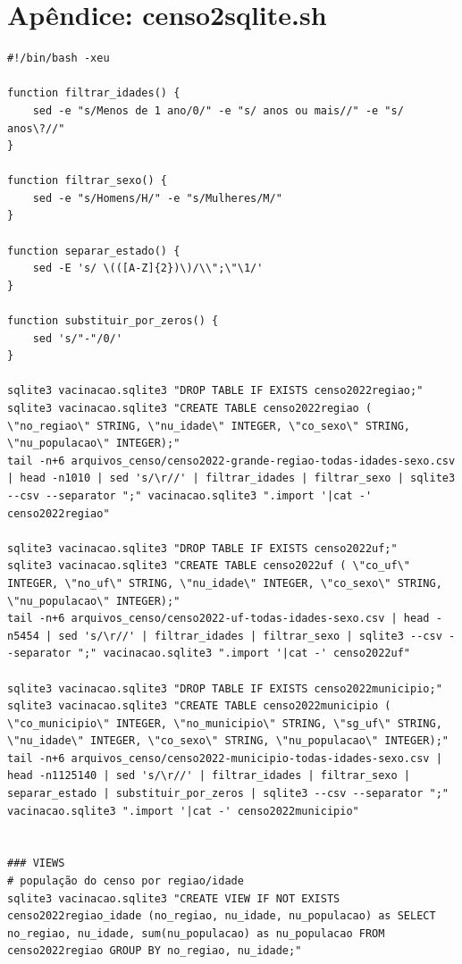 \documentclass[12pt]{article}
\begin{document}
\section{Apêndice: censo2sqlite.sh}
\begin{verbatim}
#!/bin/bash -xeu

function filtrar_idades() {
    sed -e "s/Menos de 1 ano/0/" -e "s/ anos ou mais//" -e "s/ anos\?//"
}

function filtrar_sexo() {
    sed -e "s/Homens/H/" -e "s/Mulheres/M/"
}

function separar_estado() {
    sed -E 's/ \(([A-Z]{2})\)/\\";\"\1/'
}

function substituir_por_zeros() {
    sed 's/"-"/0/'
}

sqlite3 vacinacao.sqlite3 "DROP TABLE IF EXISTS censo2022regiao;"
sqlite3 vacinacao.sqlite3 "CREATE TABLE censo2022regiao ( \"no_regiao\" STRING, \"nu_idade\" INTEGER, \"co_sexo\" STRING, \"nu_populacao\" INTEGER);"
tail -n+6 arquivos_censo/censo2022-grande-regiao-todas-idades-sexo.csv | head -n1010 | sed 's/\r//' | filtrar_idades | filtrar_sexo | sqlite3 --csv --separator ";" vacinacao.sqlite3 ".import '|cat -' censo2022regiao"

sqlite3 vacinacao.sqlite3 "DROP TABLE IF EXISTS censo2022uf;"
sqlite3 vacinacao.sqlite3 "CREATE TABLE censo2022uf ( \"co_uf\" INTEGER, \"no_uf\" STRING, \"nu_idade\" INTEGER, \"co_sexo\" STRING, \"nu_populacao\" INTEGER);"
tail -n+6 arquivos_censo/censo2022-uf-todas-idades-sexo.csv | head -n5454 | sed 's/\r//' | filtrar_idades | filtrar_sexo | sqlite3 --csv --separator ";" vacinacao.sqlite3 ".import '|cat -' censo2022uf"

sqlite3 vacinacao.sqlite3 "DROP TABLE IF EXISTS censo2022municipio;"
sqlite3 vacinacao.sqlite3 "CREATE TABLE censo2022municipio ( \"co_municipio\" INTEGER, \"no_municipio\" STRING, \"sg_uf\" STRING, \"nu_idade\" INTEGER, \"co_sexo\" STRING, \"nu_populacao\" INTEGER);"
tail -n+6 arquivos_censo/censo2022-municipio-todas-idades-sexo.csv | head -n1125140 | sed 's/\r//' | filtrar_idades | filtrar_sexo | separar_estado | substituir_por_zeros | sqlite3 --csv --separator ";" vacinacao.sqlite3 ".import '|cat -' censo2022municipio"


### VIEWS
# população do censo por regiao/idade
sqlite3 vacinacao.sqlite3 "CREATE VIEW IF NOT EXISTS censo2022regiao_idade (no_regiao, nu_idade, nu_populacao) as SELECT no_regiao, nu_idade, sum(nu_populacao) as nu_populacao FROM censo2022regiao GROUP BY no_regiao, nu_idade;"


\end{verbatim}
\end{document}
